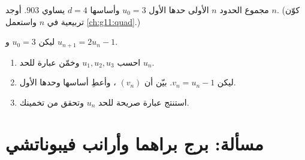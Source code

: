 \begin{exercise}[$\star\star$]\label{exo:g11:seq:10}
مجموع الحدود $n$ الأولى  حدها الأول $u_0 = 3$
وأساسها $d = 4$ يساوي $903$. أوجد $n$. (كوّن  تربيعية في $n$
واستعمل \cref{ch:g11:quad}.)
\end{exercise}

\begin{exercise}[$\star\star\star$]\label{exo:g11:seq:11}
ليكن $u_0 = 3$ و $u_{n+1} = 2u_n - 1$.
\begin{enumerate}
  \item احسب $u_1, u_2, u_3$ وخمّن عبارة للحد $u_n$.
  \item ليكن $v_n = u_n - 1$. بيّن أن $(v_n)$ ، وأعطِ
        أساسها وحدها الأول.
  \item استنتج عبارة صريحة للحد $u_n$ وتحقق من تخمينك.
\end{enumerate}
\end{exercise}

\section{مسألة: برج براهما وأرانب فيبوناتشي}

